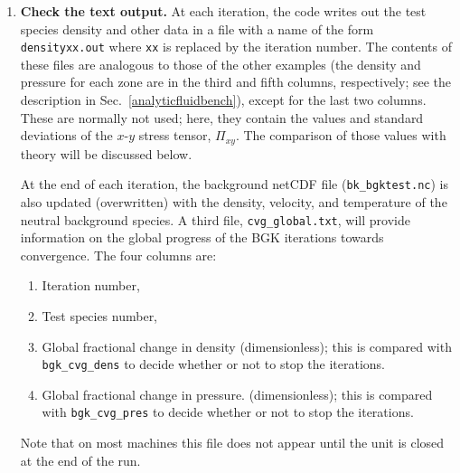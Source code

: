 \documentclass[12pt]{report}
\begin{document}
\begin{enumerate}
tests, \verb+bgk_cvg_dens+ and \verb+bgk_cvg_pres+, 
are set to ridiculously small
values ($10^{-8}$) to ensure that all 10 iterations are completed.
  \item {\bf Check the text output.} At each iteration, the code writes out the 
test species density and other data in a file with a name of the form
{\tt densityxx.out} where {\tt xx} is replaced by the iteration number. 
The contents of these files are analogous to those of the other examples
(the density and pressure for each zone are in the third and fifth
columns, respectively; 
see the description in Sec.~\ref{analyticfluidbench}), except for the
last two columns. These are normally not used; here, they contain the
values and standard deviations of the $x$-$y$ stress tensor, $\Pi_{xy}$.
The comparison of those values with theory will be discussed below.
 
At the end of
each iteration, the background netCDF file ({\tt bk\_bgktest.nc}) is 
also updated (overwritten) with
the density, velocity, and temperature of the neutral background species.
A third file, {\tt cvg\_global.txt}, will provide information on the
global progress of the BGK iterations towards convergence. The four columns are:
\begin{enumerate}
  \item Iteration number,
  \item Test species number,
  \item Global fractional change in density (dimensionless); this is compared
with \verb+bgk_cvg_dens+ to decide whether or not to stop the iterations.
  \item Global fractional change in pressure. (dimensionless); this is compared
with \verb+bgk_cvg_pres+ to decide whether or not to stop the iterations.
\end{enumerate}
Note that on most machines this file 
does not appear until the unit is closed at the end of the run.


\end{enumerate}
\end{document}
